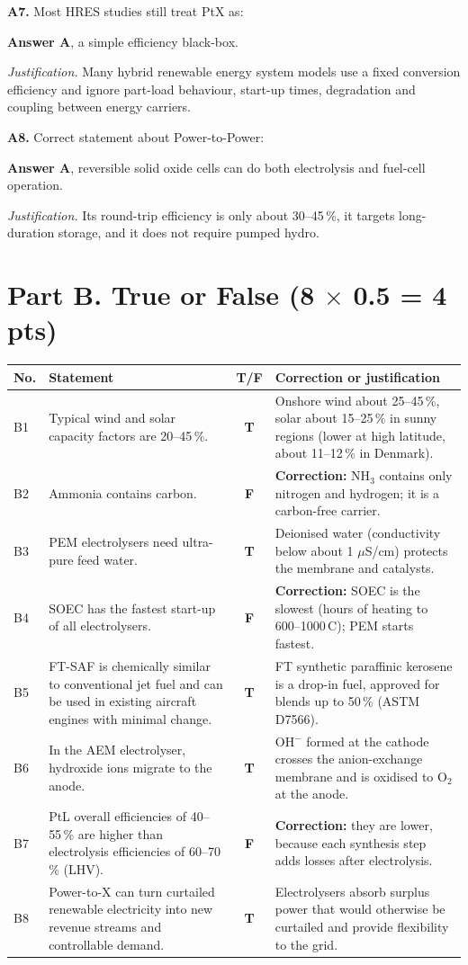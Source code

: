\documentclass[11pt,a4paper]{article}
\newcommand{\degC}{\,\textdegree C}
\newcommand{\q}[2]{\par\medskip\textbf{#1.} #2\par}
\newcommand{\answer}[2]{\textcolor{ans}{\textbf{Answer #1}}, #2\par}
\newcommand{\why}[1]{\textit{Justification.} #1\par}
\newcommand{\fillin}[1]{\textcolor{ans}{\textbf{#1}}}
\newcommand{\pts}[1]{\hfill{\normalsize\textbf{(#1)}}}
\begin{document}
\q{A7}{Most HRES studies still treat PtX as:}
\answer{A}{a simple efficiency black-box.}
\why{Many hybrid renewable energy system models use a fixed conversion efficiency and ignore part-load behaviour,
start-up times, degradation and coupling between energy carriers.}

\q{A8}{Correct statement about Power-to-Power:}
\answer{A}{reversible solid oxide cells can do both electrolysis and fuel-cell operation.}
\why{Its round-trip efficiency is only about 30--45\,\%, it targets long-duration storage, and it does not require pumped
hydro.}

\section{Part B. True or False \pts{8 $\times$ 0.5 = 4 pts}}

{\small
\renewcommand{\arraystretch}{1.35}
\begin{tabularx}{\linewidth}{@{}p{0.6cm}>{\raggedright\arraybackslash}p{5.6cm}c>{\raggedright\arraybackslash}X@{}}
\toprule
\textbf{No.} & \textbf{Statement} & \textbf{T/F} & \textbf{Correction or justification}\\
\midrule
B1 & Typical wind and solar capacity factors are 20--45\,\%. & \fillin{T} &
  Onshore wind about 25--45\,\%, solar about 15--25\,\% in sunny regions (lower at high latitude, about 11--12\,\% in Denmark). \\
B2 & Ammonia contains carbon. & \fillin{F} &
  \textbf{Correction:} NH$_3$ contains only nitrogen and hydrogen; it is a carbon-free carrier. \\
B3 & PEM electrolysers need ultra-pure feed water. & \fillin{T} &
  Deionised water (conductivity below about 1 $\mu$S/cm) protects the membrane and catalysts. \\
B4 & SOEC has the fastest start-up of all electrolysers. & \fillin{F} &
  \textbf{Correction:} SOEC is the slowest (hours of heating to 600--1000\degC); PEM starts fastest. \\
B5 & FT-SAF is chemically similar to conventional jet fuel and can be used in existing aircraft engines with minimal change. & \fillin{T} &
  FT synthetic paraffinic kerosene is a drop-in fuel, approved for blends up to 50\,\% (ASTM D7566). \\
B6 & In the AEM electrolyser, hydroxide ions migrate to the anode. & \fillin{T} &
  OH$^-$ formed at the cathode crosses the anion-exchange membrane and is oxidised to O$_2$ at the anode. \\
B7 & PtL overall efficiencies of 40--55\,\% are higher than electrolysis efficiencies of 60--70\,\% (LHV). & \fillin{F} &
  \textbf{Correction:} they are lower, because each synthesis step adds losses after electrolysis. \\
B8 & Power-to-X can turn curtailed renewable electricity into new revenue streams and controllable demand. & \fillin{T} &
  Electrolysers absorb surplus power that would otherwise be curtailed and provide flexibility to the grid. \\
\bottomrule
\end{tabularx}}
\end{document}
